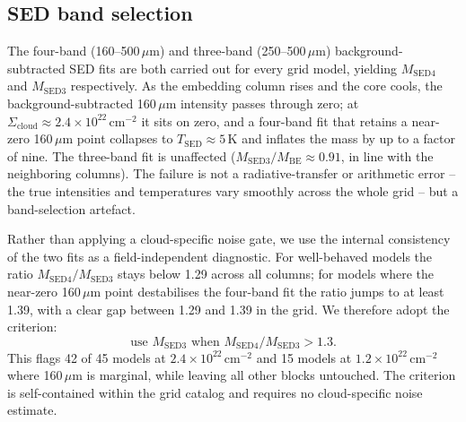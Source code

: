 \documentclass[11pt,a4paper]{article}
\newcommand{\Scloud}{\Sigma_{\mathrm{cloud}}}
\newcommand{\Tsed}{T_{\mathrm{SED}}}
\begin{document}
\subsection{SED band selection}
\label{sec:bandselect}

The four-band (160--500\,$\mu$m) and three-band (250--500\,$\mu$m)
background-subtracted SED fits are both carried out for every grid model, yielding
$M_{\mathrm{SED4}}$ and $M_{\mathrm{SED3}}$ respectively. As the embedding
column rises and the core cools, the background-subtracted 160\,$\mu$m
intensity passes through zero; at $\Scloud\approx2.4\times10^{22}\,
\mathrm{cm^{-2}}$ it sits on zero, and a four-band fit that retains a
near-zero 160\,$\mu$m point collapses to $\Tsed\approx5$\,K and inflates the
mass by up to a factor of nine. The three-band fit is unaffected
($M_{\mathrm{SED3}}/M_{\mathrm{BE}}\approx0.91$, in line with the
neighboring columns). The failure is not a radiative-transfer or arithmetic
error -- the true intensities and temperatures vary smoothly across the whole
grid -- but a band-selection artefact.

Rather than applying a cloud-specific noise gate, we use the internal
consistency of the two fits as a field-independent diagnostic. For well-behaved
models the ratio $M_{\mathrm{SED4}}/M_{\mathrm{SED3}}$ stays below 1.29
across all columns; for models where the near-zero 160\,$\mu$m point
destabilises the four-band fit the ratio jumps to at least 1.39, with a
clear gap between 1.29 and 1.39 in the grid. We therefore adopt the criterion:
\begin{equation}
  \text{use } M_{\mathrm{SED3}} \text{ when }
  M_{\mathrm{SED4}}/M_{\mathrm{SED3}} > 1.3.
  \label{eq:sedselect}
\end{equation}
This flags 42 of 45 models at $2.4\times10^{22}\,\mathrm{cm^{-2}}$ and 15
models at $1.2\times10^{22}\,\mathrm{cm^{-2}}$ where 160\,$\mu$m is
marginal, while leaving all other blocks untouched. The criterion is
self-contained within the grid catalog and requires no cloud-specific noise
estimate.

\end{document}
